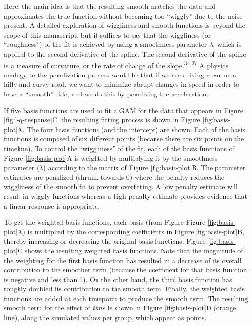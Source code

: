 \documentclass[
]{article}
\begin{document}
Here, the main idea is that the resulting smooth matches the data and approximates the true function without becoming too ``wiggly'' due to the noise present. A detailed exploration of wiggliness and smooth functions is beyond the scope of this manuscript, but it suffices to say that the wiggliness (or ``roughness'') of the fit is achieved by using a smoothness parameter \(\lambda\), which is applied to the second derivative of the spline. The second derivative of the spline is a measure of curvature, or the rate of change of the slope.\textsuperscript{\protect\hyperlink{ref-simpson2018}{34},\protect\hyperlink{ref-wood2017}{37}} A physics analogy to the penalization process would be that if we are driving a car on a hilly and curvy road, we want to minimize abrupt changes in speed in order to have a ``smooth'' ride, and we do this by penalizing the acceleration.

If five basis functions are used to fit a GAM for the data that appears in Figure \ref{fig:l-q-response}C, the resulting fitting process is shown in Figure \ref{fig:basis-plot}A. The four basis functions (and the intercept) are shown. Each of the basis functions is composed of six different points (because there are six points on the timeline). To control the ``wiggliness'' of the fit, each of the basis functions of Figure \ref{fig:basis-plot}A is weighted by multiplying it by the smoothness parameter (\(\lambda\)) according to the matrix of Figure \ref{fig:basis-plot}B. The parameter estimates are penalized (shrunk towards 0) where the penalty reduces the wiggliness of the smooth fit to prevent overfitting. A low penalty estimate will result in wiggly functions whereas a high penalty estimate provides evidence that a linear response is appropriate.

To get the weighted basis functions, each basis (from Figure Figure \ref{fig:basis-plot}A) is multiplied by the corresponding coefficients in Figure \ref{fig:basis-plot}B, thereby increasing or decreasing the original basis functions. Figure \ref{fig:basis-plot}C shows the resulting weighted basis functions. Note that the magnitude of the weighting for the first basis function has resulted in a decrease of its overall contribution to the smoother term (because the coefficient for that basis function is negative and less than 1). On the other hand, the third basis function has roughly doubled its contribution to the smooth term. Finally, the weighted basis functions are added at each timepoint to produce the smooth term. The resulting smooth term for the effect of \emph{time} is shown in Figure \ref{fig:basis-plot}D (orange line), along the simulated values per group, which appear as points.
\end{document}
